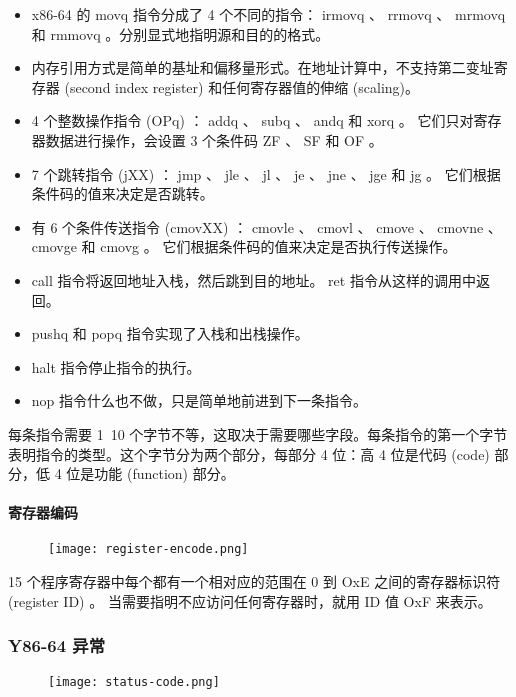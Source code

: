 \begin{itemize}
    \item x86-64 的 movq 指令分成了 4 个不同的指令： irmovq 、 rrmovq 、 mrmovq 和 rmmovq 。分别显式地指明源和目的的格式。
    \item 内存引用方式是简单的基址和偏移量形式。在地址计算中，不支持第二变址寄存器 (second index register) 和任何寄存器值的伸缩 (scaling)。
    \item 4 个整数操作指令 (OPq) ： addq 、 subq 、 andq 和 xorq 。 它们只对寄存器数据进行操作，会设置 3 个条件码 ZF 、 SF 和 OF 。
    \item 7 个跳转指令 (jXX) ： jmp 、 jle 、 jl 、 je 、 jne 、 jge 和 jg 。 它们根据条件码的值来决定是否跳转。
    \item 有 6 个条件传送指令 (cmovXX) ： cmovle 、 cmovl 、 cmove 、 cmovne 、 cmovge 和 cmovg 。 它们根据条件码的值来决定是否执行传送操作。
    \item call 指令将返回地址入栈，然后跳到目的地址。 ret 指令从这样的调用中返回。
    \item pushq 和 popq 指令实现了入栈和出栈操作。
    \item halt 指令停止指令的执行。
    \item nop 指令什么也不做，只是简单地前进到下一条指令。
\end{itemize}

每条指令需要 1~10 个字节不等，这取决于需要哪些字段。每条指令的第一个字节表明指令的类型。这个字节分为两个部分，每部分 4 位：高 4 位是代码 (code) 部分，低 4 位是功能 (function) 部分。

\paragraph{寄存器编码}
\begin{figure}[H]
    \centering
    \texttt{[image: register-encode.png]}
\end{figure}

15 个程序寄存器中每个都有一个相对应的范围在 0 到 OxE 之间的寄存器标识符 (register ID) 。 当需要指明不应访问任何寄存器时，就用 ID 值 OxF 来表示。

\subsubsection{Y86-64 异常}

\begin{figure}[H]
    \centering
    \texttt{[image: status-code.png]}
\end{figure}

